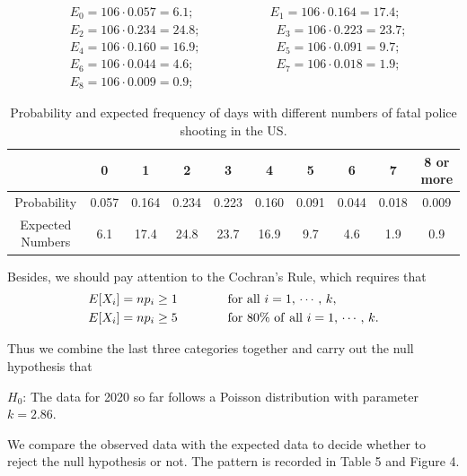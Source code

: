 \documentclass[a4paper]{article}
\begin{document}
\begin{equation}
\begin{split}
&E_0=106\cdot0.057=6.1; \qquad \qquad \qquad E_1=106\cdot0.164=17.4;  \\
&E_2=106\cdot0.234=24.8; \qquad \qquad \qquad E_3=106\cdot0.223=23.7;  \\
&E_4=106\cdot0.160=16.9; \qquad \qquad \qquad E_5=106\cdot0.091=9.7;  \\
&E_6=106\cdot0.044=4.6; \qquad \qquad \qquad \,\, \, E_7=106\cdot0.018=1.9;  \\
&E_8=106\cdot0.009=0.9; \qquad \qquad \qquad\,\, \,\,\, \, 
\nonumber
\end{split}
\end{equation}    
    
    \begin{table}[H]
    \centering
    \begin{tabular}{|c|c|c|c|c|c|c|c|c|c|}
    \hline
    &0&1&2&3&4&5&6&7&8 or more\\
    \hline
    Probability&0.057&0.164&0.234&0.223&0.160&0.091&0.044&0.018&0.009\\
    \hline
    Expected Numbers&6.1&17.4&24.8&23.7&16.9&9.7&4.6&1.9&0.9\\
    \hline
    
    \end{tabular}
    \caption{Probability and expected frequency of days with different numbers of fatal police shooting in the US.}
    \end{table}
    
	Besides, we should pay attention to the Cochran's Rule, which requires that
\begin{equation}
\begin{split}
&E[X_i]=np_i\ge1\qquad \qquad {\rm for\ all}\ i=1,\,\cdots,\,k,\\
&E[X_i]=np_i\ge5\qquad \qquad {\rm for\ 80\% \ of\ all}\ i=1,\,\cdots,\,k.
\nonumber
\end{split}
\end{equation}    
    
    Thus we combine the last three categories together and carry out the null hypothesis that
    
    \begin{center}
    $H_0$: The data for 2020 so far follows a Poisson distribution with parameter $k=2.86$.
    \end{center}
    
    We compare the observed data with the expected data to decide whether to reject the null hypothesis or not. The pattern is recorded in Table 5 and Figure 4.
    
\end{document}
